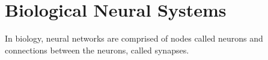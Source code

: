 










\section{Biological Neural Systems} 
\label{secTheBiologicalNeuralSystem}
In biology, neural networks are comprised of nodes called neurons and connections between the neurons, called synapses. 


